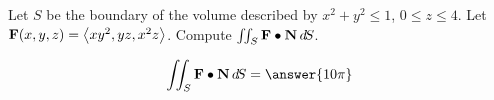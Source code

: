 \documentclass{ximera}
\author{David Guichard \and Neal Koblitz \and H. Jerome Keisler \and Albert Scheller \and Barry Balof \and Mike Wills \and Matthew Carr}
\begin{document}
\begin{exercise}




Let $S$ be the boundary of the volume described by $x^2+y^2\le 1$, $0\le z\le 4$. Let $\mathbf{F}(x,y,z)=\left\langle xy^2,yz,x^2 z\right\rangle$.
Compute $\iint_{S}\mathbf{F}\bullet\mathbf{N}\mathop{}\!d\! S$.

\begin{prompt}
\[
\iint_{S}\vec{F}\dotp\vec{N}\d S=\answer{10\pi}
\]
\end{prompt}


\end{exercise}
\end{document}
